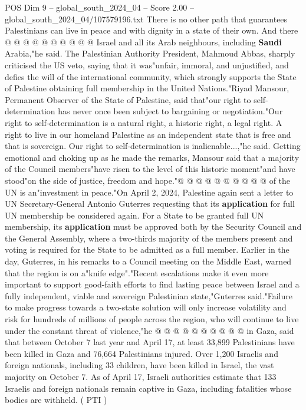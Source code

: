 \begin{textsample}{POS Dim 9 – global\_south\_2024\_04 – Score 2.00 – global\_south\_2024\_04/107579196.txt}
There is no other path that guarantees Palestinians can live in peace and with dignity in a state of their own.
And there @ @ @ @ @ @ @ @ @ @ Israel and all its Arab neighbours, including \textbf{Saudi} Arabia,"he said.
The Palestinian Authority President, Mahmoud Abbas, sharply criticised the US veto, saying that it was"unfair, immoral, and unjustified, and defies the will of the international community, which strongly supports the State of Palestine obtaining full membership in the United Nations."Riyad Mansour, Permanent Observer of the State of Palestine, said that"our right to self-determination has never once been subject to bargaining or negotiation."Our right to self-determination is a natural right, a historic right, a legal right.
A right to live in our homeland Palestine as an independent state that is free and that is sovereign.
Our right to self-determination is inalienable...,"he said.
Getting emotional and choking up as he made the remarks, Mansour said that a majority of the Council members"have risen to the level of this historic moment"and have stood"on the side of justice, freedom and hope."@ @ @ @ @ @ @ @ @ @ of the UN is an"investment in peace."On April 2, 2024, Palestine again sent a letter to UN Secretary-General Antonio Guterres requesting that its \textbf{application} for full UN membership be considered again.
For a State to be granted full UN membership, its \textbf{application} must be approved both by the Security Council and the General Assembly, where a two-thirds majority of the members present and voting is required for the State to be admitted as a full member.
Earlier in the day, Guterres, in his remarks to a Council meeting on the Middle East, warned that the region is on a"knife edge"."Recent escalations make it even more important to support good-faith efforts to find lasting peace between Israel and a fully independent, viable and sovereign Palestinian state,"Guterres said."Failure to make progress towards a two-state solution will only increase volatility and risk for hundreds of millions of people across the region, who will continue to live under the constant threat of violence,"he @ @ @ @ @ @ @ @ @ @ in Gaza, said that between October 7 last year and April 17, at least 33,899 Palestinians have been killed in Gaza and 76,664 Palestinians injured.
Over 1,200 Israelis and foreign nationals, including 33 children, have been killed in Israel, the vast majority on October 7.
As of April 17, Israeli authorities estimate that 133 Israelis and foreign nationals remain captive in Gaza, including fatalities whose bodies are withheld. ( PTI )

\end{textsample}
